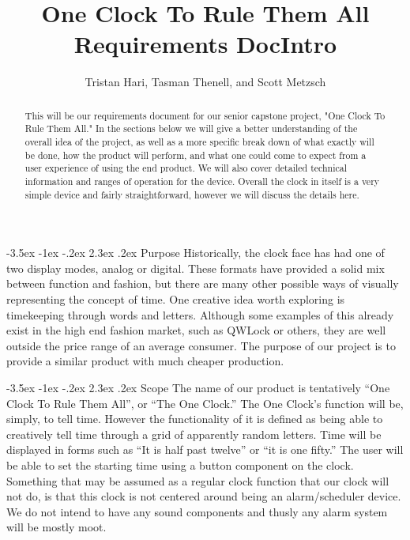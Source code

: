 \documentclass[10pt,draftclsnofoot,onecolumn]{IEEEtran}
\makeatletter
\renewcommand\section{\@startsection {section}{1}{\z@}%
                                   {-3.5ex \@plus -1ex \@minus -.2ex}%
                                   {2.3ex \@plus.2ex}%
                                   {\normalfont\LARGE\bfseries}}%
\makeatother
\begin{document}
\title{One Clock To Rule Them All Requirements Doc}
\author{Tristan Hari, Tasman Thenell, and Scott Metzsch}
\maketitle
\begin{abstract}
This will be our requirements document for our senior capstone project, "One Clock To Rule Them All."
In the sections below we will give a better understanding of the overall idea of the project, as
well as a more specific break down of what exactly will be done, how the product will perform,
and what one could come to expect from a user experience of using the end product. We will also
cover detailed technical information and ranges of operation for the device. Overall the clock in
itself is a very simple device and fairly straightforward, however we will discuss the details here.
\end{abstract}
\IEEEpeerreviewmaketitle

\newpage
\tableofcontents
\newpage


\title{Intro}
\section{Purpose}
Historically, the clock face has had one of two display modes, analog or digital.
These formats have provided a solid mix between function and fashion, but there are many
other possible ways of visually representing the concept of time. One creative idea worth
exploring is timekeeping through words and letters. Although some examples of this already
exist in the high end fashion market, such as QWLock or others, they are well outside the
price range of an average consumer. The purpose of our project is to provide a similar
product with much cheaper production.

\section{Scope}
The name of our product is tentatively “One Clock To Rule Them All”, or “The One Clock.”
The One Clock’s function will be, simply, to tell time. However the functionality of it is
defined as being able to creatively tell time through a grid of apparently random letters.
Time will be displayed in forms such as “It is half past twelve” or “it is one fifty.” The
user will be able to set the starting time using a button component on the clock. Something
that may be assumed as a regular clock function that our clock will not do, is that this clock
 is not centered around being an alarm/scheduler device. We do not intend to have any sound
 components and thusly any alarm system will be mostly moot.
\end{document}
